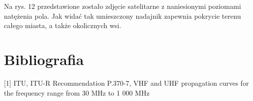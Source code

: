 \documentclass[12pt, a4paper, oneside]{article}
\begin{document}
\indent Na rys. 12 przedstawione zostało zdjęcie satelitarne z naniesionymi poziomami natężenia pola. Jak widać tak umieszczony nadajnik zapewnia pokrycie terenu całego miasta, a także okolicznych wsi.
\clearpage
\section{Bibliografia}
[1] ITU, ITU-R Recommendation P.370-7, VHF and UHF propagation curves for the frequency range from 30 MHz to 1 000 MHz
\end{document}
